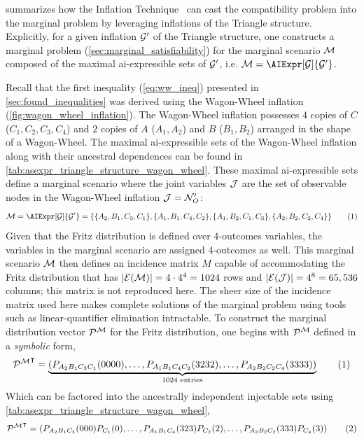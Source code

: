 \documentclass[aps, 10pt, english, twoside, pra, nofootinbib, tightenlines, longbibliography, superscriptaddress]{revtex4-1}
\begin{document}
     summarizes how the Inflation Technique~\cite{Inflation} can cast the compatibility problem into the marginal problem by leveraging inflations of the Triangle structure. Explicitly, for a given inflation $\mathcal{G}'$ of the Triangle structure, one constructs a marginal problem (\cref{sec:marginal_satisfiability}) for the marginal scenario $\mathcal{M}$ composed of the maximal ai-expressible sets of $\mathcal{G}'$, i.e. $\mscenario = \AIExpr[\graph]{\graph'}$.

    Recall that the first inequality (\cref{eq:ww_ineq}) presented in \cref{sec:found_inequalities} was derived using the Wagon-Wheel inflation (\cref{fig:wagon_wheel_inflation}). The Wagon-Wheel inflation possesses $4$ copies of $C$ ($C_1, C_2, C_3, C_4$) and $2$ copies of $A$ ($A_1, A_2$) and $B$ ($B_1, B_2$) arranged in the shape of a Wagon-Wheel. The maximal ai-expressible sets of the Wagon-Wheel inflation along with their ancestral dependences can be found in \cref{tab:asexpr_triangle_structure_wagon_wheel}. These maximal ai-expressible sets define a marginal scenario where the joint variables $\mathcal{J}$ are the set of observable nodes in the Wagon-Wheel inflation $\mathcal{J} = \mathcal{N}'_O$:
    \[ \mscenario = \AIExpr[\graph]{\graph'} = \bc{\bc{A_2, B_1, C_3, C_1}, \bc{A_1, B_1, C_4, C_2}, \bc{A_1, B_2, C_1, C_3}, \bc{A_2, B_2, C_2, C_4}} \eq \label{eq:wagon_wheel_marginal_model}\]
    Given that the Fritz distribution is defined over $4$-outcomes variables, the variables in the marginal scenario are assigned $4$-outcomes as well. This marginal scenario $\mathcal{M}$ then defines an incidence matrix $M$ capable of accommodating the Fritz distribution that has $\abs{\Events{\mscenario}} = 4 \cdot 4^{4} = 1024$ rows and $\abs{\Events{\jointvar}} = 4^8 = 65,536$ columns; this matrix is not reproduced here. The sheer size of the incidence matrix used here makes complete solutions of the marginal problem using tools such as linear-quantifier elimination intractable. To construct the marginal distribution vector $\probvec^{\mscenario}$ for the Fritz distribution, one begins with $\probvec^{\mscenario}$ defined in a \textit{symbolic} form,
    \[ {\probvec^{\mscenario}}^{\intercal} = \underbrace{\br{\prob[A_2B_1C_3C_1]\br{0000}, \ldots, \prob[A_1B_1C_4C_2]\br{3232}, \ldots, \prob[A_2B_2C_2C_4]\br{3333}}}_{1024 \text{ entries}} \eq \label{eq:marginal_vector_wagon_wheel} \]
    Which can be factored into the ancestrally independent injectable sets using \cref{tab:asexpr_triangle_structure_wagon_wheel},
    \[ {\probvec^{\mscenario}}^{\intercal} = \br{\prob[A_2B_1C_3]\br{000}\prob[C_1]\br{0}, \ldots, \prob[A_1B_1C_4]\br{323}\prob[C_2]\br{2}, \ldots, \prob[A_2B_2C_2]\br{333}\prob[C_4]\br{3}} \eq \label{eq:marginal_vector_wagon_wheel_factors}\]
\end{document}
